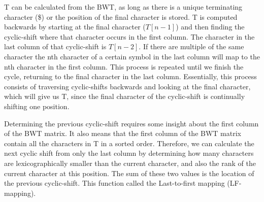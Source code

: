 T can be calculated from the BWT, as long as there is a unique terminating character (\$)
or the position of the final character is stored. T is computed backwards by starting at
the final character ($T[n - 1]$) and then finding the cyclic-shift where that character
occurs in the first column. The character in the last column of that cyclic-shift is $T[n
- 2]$. If there are multiple of the same character the nth character of a certain symbol
in the last column will map to the nth character in the first column. This process is
repeated until we finish the cycle, returning to the final character in the last column.
Essentially, this process consists of traversing cyclic-shifts backwards and looking at
the final character, which will give us T, since the final character of the cyclic-shift
is continually shifting one position.

Determining the previous cyclic-shift requires some insight about the first column of the
BWT matrix.  It also means that the first column of
the BWT matrix contain all the characters in T in a sorted order. Therefore, we can
calculate the next cyclic shift from only the last column by determining how many
characters are lexicographically smaller than the current character, and
also the rank of the current character at this position. The sum of these two values is
the location of the previous cyclic-shift. This function called the Last-to-first
mapping (LF-mapping).


\begin{table}
	\begin{center}
		\hspace{1cm}
    \caption{T = BANANA\$, BWT = ANNB\$AA}
    \label{table:bwt}
	\end{center}
\end{table}

